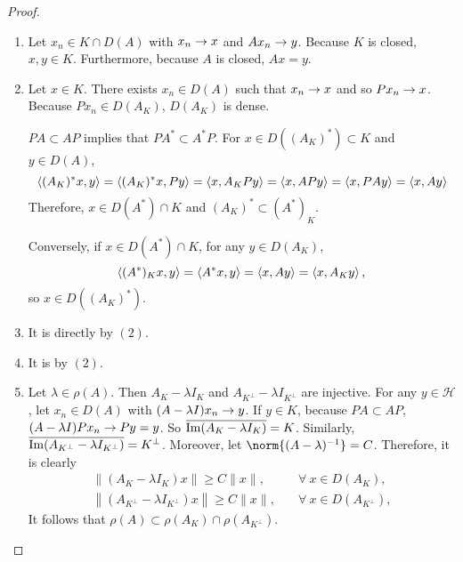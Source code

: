 \documentclass[a4paper,12pt]{article}
\begin{document}
\begin{proof}
    \begin{enumerate}[label=(\arabic{*})]
        \item Let $x_n \in K \cap D(A)$ with $x_n \rightarrow x$ and $Ax_n \rightarrow y$. Because $K$ is closed, $x,y \in K$. Furthermore, because $A$ is closed, $Ax = y$.

        \item Let $x \in K$. There exists $x_n \in D(A)$ such that $x_n \rightarrow x$ and so $Px_n \rightarrow x$. Because $Px_n \in D(A_K)$, $D(A_K)$ is dense.

        $PA \subset AP$ implies that $PA^* \subset A^*P$. For $x \in D((A_K)^*) \subset K$ and $y \in D(A)$,
        \begin{equation*}
            \left\langle (A_K)^*x,y \right\rangle = \left\langle (A_K)^*x,Py \right\rangle = \left\langle x,A_KPy \right\rangle = \left\langle x,APy \right\rangle = \left\langle x,PAy \right\rangle = \left\langle x,Ay \right\rangle
        \end{equation*}
        Therefore, $x \in D(A^*) \cap K$ and $(A_K)^* \subset (A^*)_K$.

        Conversely, if $x \in D(A^*) \cap K$, for any $y \in D(A_K)$,
        \begin{equation*}
            \left\langle (A^*)_Kx,y \right\rangle = \left\langle A^*x, y \right\rangle = \left\langle x,Ay \right\rangle = \left\langle x,A_Ky \right\rangle,
        \end{equation*}
        so $x \in D((A_K)^*)$.

        \item It is directly by $(2)$.

        \item It is by $(2)$.

        \item Let $\lambda \in \rho(A)$. Then $A_K - \lambda I_K$ and $A_{K^\perp} - \lambda I_{K^{\perp}}$ are injective. For any $y \in \mathcal{H}$, let $x_n \in D(A)$ with $(A - \lambda I)x_n \rightarrow y$. If $y \in K$, because $PA \subset AP$, $(A - \lambda I)Px_n \rightarrow Py = y$. So $\overline{\operatorname{Im} (A_K -\lambda I_K)} = K$. Similarly, $\overline{\operatorname{Im} (A_{K^\perp} - \lambda I_{K^{\perp}})} = K^\perp$. Moreover, let $\norm{(A-\lambda)^{-1}} = C$. Therefore, it is clearly 
        \begin{equation*}
            \begin{aligned}
                \left\|\left(A_K-\lambda I_K\right) x\right\| \geq C\|x\|,& \quad \forall~ x \in D(A_K), \\
                \left\|\left(A_{K^\perp}-\lambda I_{K^\perp}\right) x\right\| \geq C\|x\|,& \quad \forall~ x \in D(A_{K^\perp}),  
            \end{aligned}
        \end{equation*}
        It follows that $\rho(A) \subset \rho(A_K) \cap \rho(A_{K^\perp})$.


\end{enumerate}
\end{proof}
\end{document}
